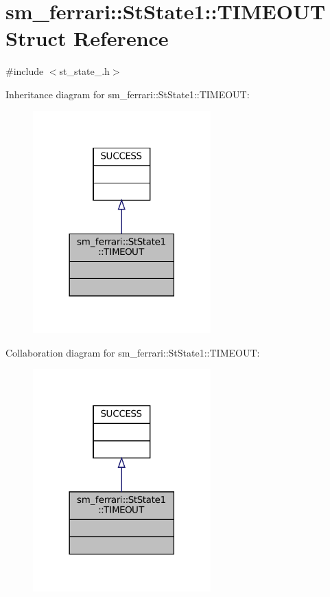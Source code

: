 \hypertarget{structsm__ferrari_1_1StState1_1_1TIMEOUT}{}\section{sm\+\_\+ferrari\+:\+:St\+State1\+:\+:T\+I\+M\+E\+O\+UT Struct Reference}
\label{structsm__ferrari_1_1StState1_1_1TIMEOUT}


{\ttfamily \#include $<$st\+\_\+state\+\_.\+h$>$}



Inheritance diagram for sm\+\_\+ferrari\+:\+:St\+State1\+:\+:T\+I\+M\+E\+O\+UT\+:
\nopagebreak
\begin{figure}[H]
\begin{center}
\leavevmode
\includegraphics[width=194pt]{structsm__ferrari_1_1StState1_1_1TIMEOUT__inherit__graph}
\end{center}
\end{figure}


Collaboration diagram for sm\+\_\+ferrari\+:\+:St\+State1\+:\+:T\+I\+M\+E\+O\+UT\+:
\nopagebreak
\begin{figure}[H]
\begin{center}
\leavevmode
\includegraphics[width=194pt]{structsm__ferrari_1_1StState1_1_1TIMEOUT__coll__graph}
\end{center}
\end{figure}


